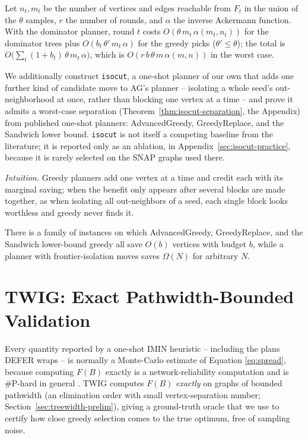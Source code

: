 \documentclass[ASNA,number]{USG}
\newcommand{\FF}{F}
\begin{document}
\begin{theorem}\label{thm:defer-complexity}
Let $n_t,m_t$ be the number of vertices and edges reachable from $F_t$ in
the union of the $\theta$ samples, $r$ the number of rounds, and $\alpha$
the inverse Ackermann function. With the dominator planner, round $t$ costs
$O(\theta\,m_t\,\alpha(m_t,n_t))$ for the dominator trees plus
$O(b_t\,\theta'\,m_t\,\alpha)$ for the greedy picks ($\theta'\le\theta$);
the total is $O\bigl(\sum_t(1+b_t)\,\theta\,m_t\,\alpha\bigr)$, which is
$O(r\,b\,\theta\,m\,\alpha(m,n))$ in the worst case.
\end{theorem}

We additionally construct \texttt{isocut}, a one-shot planner of our own
that adds one further kind of candidate move to AG's planner --
isolating a whole seed's out-neighborhood at once, rather than blocking
one vertex at a time -- and prove it admits a worst-case separation
(Theorem~\ref{thm:isocut-separation}, the Appendix) from published
one-shot planners: AdvancedGreedy, GreedyReplace, and the Sandwich lower
bound. \texttt{isocut} is not itself a competing baseline from the
literature; it is reported only as an ablation, in
Appendix~\ref{sec:isocut-practice}, because it is rarely selected
on the SNAP graphs used there.

\emph{Intuition.} Greedy planners add one vertex at a time and credit each
with its marginal saving; when the benefit only appears after several
blocks are made together, as when isolating all out-neighbors of a seed, each
single block looks worthless and greedy never finds it.

\begin{theorem}\label{thm:isocut-separation}
There is a family of instances on which AdvancedGreedy, GreedyReplace, and
the Sandwich lower-bound greedy all save $O(b)$ vertices with budget $b$,
while a planner with frontier-isolation moves saves $\Omega(N)$ for
arbitrary $N$.
\end{theorem}

\section{TWIG: Exact Pathwidth-Bounded Validation}\label{sec:twig}

Every quantity reported by a one-shot IMIN heuristic -- including the plans
DEFER wraps -- is normally a Monte-Carlo estimate of Equation
\eqref{eq:spread}, because computing $\FF(B)$ exactly is a network-reliability
computation and is \#P-hard in general \citep{valiant1979,provan1983}. TWIG
computes $\FF(B)$ \emph{exactly} on graphs of bounded pathwidth (an elimination
order with small vertex-separation number; Section~\ref{sec:treewidth-prelim}),
giving a ground-truth oracle that we use to certify how close greedy
selection comes to the true optimum, free of sampling noise.
\end{document}
